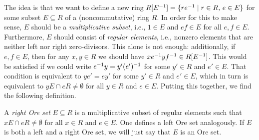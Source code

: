 The idea is that we want to define a new ring $R[E^{-1}] = \{re^{-1} \mid r \in R,\,e \in
	E\}$ for some subset $E \subseteq R$ of a (noncommutative) ring $R$. In order for this
to make sense, $E$ should be a \emph{multiplicative subset}, i.e., $1 \in E$ and $ef \in E$ for all $e,f \in E$. Furthermore, $E$ should
consist of \emph{regular elements}, i.e., nonzero elements that
are neither left nor right zero-divisors. This alone is not enough: additionally, if
$e, f \in E$, then for any $x, y \in R$ we should have $xe^{-1} yf^{-1} \in R[E^{-1}]$.
This would be satisfied if we could write $e^{-1} y = y' (e')^{-1}$ for some $y' \in R$
and $e' \in E$. That condition is equivalent to $y e' = e y'$ for some $y' \in R$ and
$e' \in E$, which in turn is equivalent to $y E \cap e R \neq \emptyset$ for all $y \in
	R$ and $e \in E$. Putting this together, we find the following definition.
\begin{definition}
	A \emph{right Ore set} $E
		\subseteq R$ is a multiplicative subset of regular elements such that $x E \cap e R
		\neq \emptyset$ for all $x \in R$ and $e \in E$. One defines a left Ore set
	analogously. If $E$ is both a left and a right Ore set, we will just say that $E$ is an Ore set.
\end{definition}

